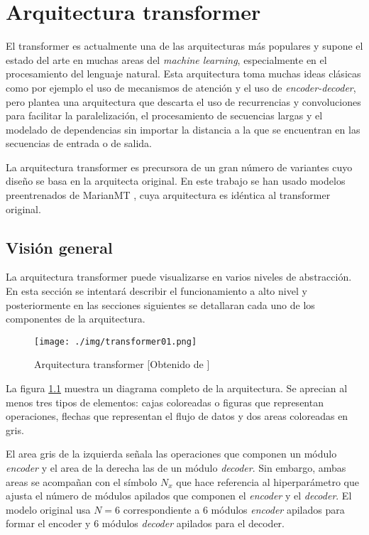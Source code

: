 \chapter{Arquitectura transformer}\label{transformerchapter}
El transformer \cite{Vaswani2017Jun} es actualmente una de las arquitecturas más populares y supone el estado del arte en muchas areas del \textit{machine learning}, especialmente en el procesamiento del lenguaje natural. Esta arquitectura toma muchas ideas clásicas como por ejemplo el uso de mecanismos de atención y el uso de \textit{encoder-decoder}, pero plantea una arquitectura que descarta el uso de recurrencias y convoluciones para facilitar la paralelización, el procesamiento de secuencias largas y el modelado de dependencias sin importar la distancia a la que se encuentran en las secuencias de entrada o de salida.

La arquitectura transformer es precursora de un gran número de variantes cuyo diseño se basa en la arquitecta original. En este trabajo se han usado modelos preentrenados de MarianMT \cite{Junczys-Dowmunt2018Apr}, cuya arquitectura es idéntica al transformer original.

\section{Visión general}\label{transformergeneral}

La arquitectura transformer puede visualizarse en varios niveles de abstracción. En esta sección se intentará describir el funcionamiento a alto nivel y posteriormente en las secciones siguientes se detallaran cada uno de los componentes de la arquitectura.

\begin{figure}[H]
    \centering
        \texttt{[image: ./img/transformer01.png]}
        \caption{Arquitectura transformer [Obtenido de \cite{Vaswani2017Jun}]}\label{transformerdiagram}
\end{figure}

La figura \ref{transformerdiagram} muestra un diagrama completo de la arquitectura. Se aprecian al menos tres tipos de elementos: cajas coloreadas o figuras que representan operaciones, flechas que representan el flujo de datos y dos areas coloreadas en gris.

El area gris de la izquierda señala las operaciones que componen un módulo \textit{encoder} y el area de la derecha las de un módulo \textit{decoder}. Sin embargo, ambas areas se acompañan con el símbolo $N_{x}$ que hace referencia al hiperparámetro que ajusta el número de módulos apilados que componen el \textit{encoder} y el \textit{decoder}. El modelo original usa $N=6$ correspondiente a 6 módulos \textit{encoder} apilados para formar el encoder y 6 módulos \textit{decoder} apilados para el decoder.

